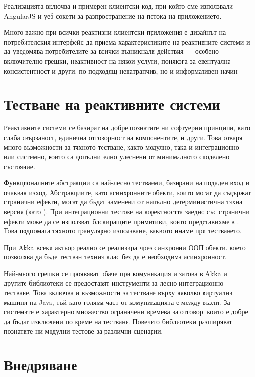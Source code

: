 Реализацията включва и примерен клиентски код, при който сме използвали AngularJS и уеб сокети за разпространение на  потока на приложението.

Много важно при всички реактивни клиентски приложения е дизайнът на потребителския интерфейс да приема характеристиките на реактивните системи и да уведомява потребителите за всички възникнали действия — особено включително грешки, неактивност на някои услуги, понякога за евентуална консистентност и други, по подходящ ненатрапчив, но и информативен начин

\section{Тестване на реактивните системи}

Реактивните системи се базират на добре познатите ни софтуерни принципи, като слаба свързаност, единична отговорност на компонентите, и други. Това отваря много възможности за тяхното тестване, както модулно, така и интеграционно или системно, които са допълнително улеснени от минималното споделено състояние.

Функционалните абстракции са най-лесно тестваеми, базирани на подаден вход и очакван изход. Абстракциите, като асинхронните  обекти, които могат да съдържат странични ефекти, могат да бъдат заменени от напълно детерминистична тяхна версия (като ). При интеграционни тестове на коректността заедно със странични ефекти може да се използват блокиращите примитиви, които представихме в . Това подпомага тяхното гранулярно използване, каквото имаме при тестването.

При Akka всеки актьор реално се реализира чрез синхронни ООП обекти, което позволява да бъде тестван техния клас без да е необходима асинхронност.

Най-много грешки се проявяват обаче при комуникация и затова в Akka и другите библиотеки се предоставят инструменти за лесно интеграционно тестване. Това включва и възможности за тестване върху няколко виртуални машини на Java, тъй като голяма част от комуникацията е между възли. За системите е характерно множество ограничени времева за отговор, които е добре да бъдат изключени по време на тестване. Повечето библиотеки разширяват познатите ни модулни тестове за различни сценарии.

\section{Внедряване}


